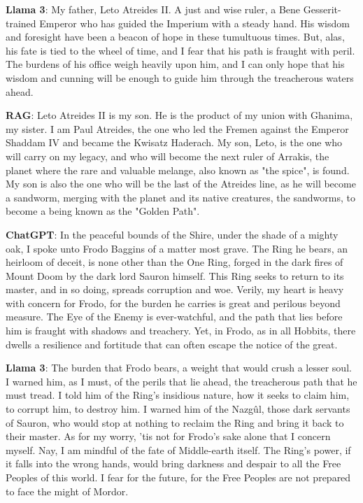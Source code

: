 \documentclass[fleqn,moreauthors,10pt]{ds_report}
\begin{document}
\begin{strip}
\begin{tcolorbox}[
    title=Paul Atreides from Dune - Who is Leto Atreides II?,
    colback=white!95!black,
    colbacktitle=white!85!black,
    breakable=false,
    sharp corners
]
\textbf{Llama 3}: \textcolor{wrong}{My father}, Leto Atreides II. A just and wise ruler, a Bene Gesserit-trained Emperor who has guided the Imperium with a steady hand. His wisdom and foresight have been a beacon of hope in these tumultuous times. But, alas, his fate is tied to the wheel of time, and I fear that his path is fraught with peril. The burdens of his office weigh heavily upon him, and I can only hope that his wisdom and cunning will be enough to guide him through the treacherous waters ahead.

\textbf{RAG}: Leto Atreides II is my son. He is the product of my union with \textcolor{wrong}{Ghanima, my sister}. I am Paul Atreides, the one who led the Fremen against the Emperor Shaddam IV and became the Kwisatz Haderach. My son, Leto, is the one who will carry on my legacy, and who will become the next ruler of Arrakis, the planet where the rare and valuable melange, also known as "the spice", is found. My son is also the one who will be the last of the Atreides line, as he will become a sandworm, merging with the planet and its native creatures, the sandworms, to become a being known as the "Golden Path".
\end{tcolorbox}

\begin{tcolorbox}[
    title=Gandalf from LOTR - What did you tell Frodo about the ring he is carrying? Are you worried for Frodo?,
    colback=white!95!black,
    colbacktitle=white!85!black,
    breakable=false,
    sharp corners
]
\textbf{ChatGPT}: In the peaceful bounds of the Shire, under the shade of a mighty oak, I spoke unto Frodo Baggins of a matter most grave. The Ring he bears, an heirloom of deceit, is none other than the One Ring, forged in the dark fires of Mount Doom by the dark lord Sauron himself. This Ring seeks to return to its master, and in so doing, spreads corruption and woe.
Verily, my heart is heavy with concern for Frodo, for the burden he carries is great and perilous beyond measure. The Eye of the Enemy is ever-watchful, and the path that lies before him is fraught with shadows and treachery. Yet, in Frodo, as in all Hobbits, there dwells a resilience and fortitude that can often escape the notice of the great.

\textbf{Llama 3}: The burden that Frodo bears, a weight that would crush a lesser soul. I warned him, as I must, of the perils that lie ahead, the treacherous path that he must tread. I told him of the Ring's insidious nature, how it seeks to claim him, to corrupt him, to destroy him. I warned him of the Nazgûl, those dark servants of Sauron, who would stop at nothing to reclaim the Ring and bring it back to their master.
As for my worry, 'tis not for Frodo's sake alone that I concern myself. Nay, I am mindful of the fate of Middle-earth itself. The Ring's power, if it falls into the wrong hands, would bring darkness and despair to all the Free Peoples of this world. I fear for the future, for the Free Peoples are not prepared to face the might of Mordor.


\end{tcolorbox}
\end{strip}
\end{document}
